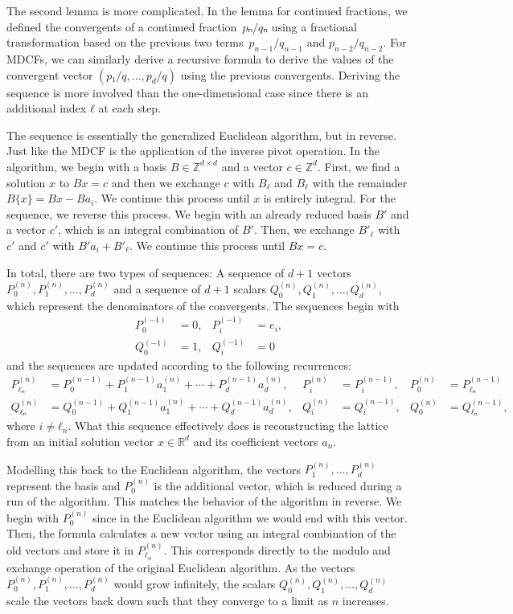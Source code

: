 The second lemma is more complicated.
In the lemma for continued fractions,
we defined the convergents of a continued fraction~$pₙ/qₙ$
using a fractional transformation based on the previous two
terms~$p_{n-1}/q_{n-1}$ and $p_{n-2}/q_{n-2}$.
For MDCFs, we can similarly derive a recursive formula to derive the values of
the convergent vector $(p₁/q, \dots, p_d/q)$ using the previous convergents.
Deriving the sequence is more involved than the one-dimensional case since
there is an additional index $ℓ$ at each step.

The sequence is essentially the generalized Euclidean algorithm, but in reverse.
Just like the MDCF is the application of the inverse pivot operation.
In the algorithm, we begin with a basis $B ∈ ℤ^{d×d}$ and a vector $c ∈ ℤ^d$.
First, we find a solution $x$ to $Bx = c$ and then we exchange $c$ with $B_ℓ$
and $B_ℓ$ with the remainder $B\{x\} = Bx - Ba_i$.
We continue this process until $x$ is entirely integral.
For the sequence, we reverse this process.
We begin with an already reduced basis $B'$ and a vector $c'$, which is an
integral combination of $B'$.
Then, we exchange $B'_{ℓ}$ with $c'$ and $c'$ with $B' a_i + B'_{ℓ}$.
We continue this process until $B x = c$.

In total, there are two types of sequences:
A sequence of $d+1$ vectors $P_0^{(n)}, P_1^{(n)}, …, P_d^{(n)}$ and a sequence
of $d+1$ scalars $Q_0^{(n)}, Q_1^{(n)}, …, Q_d^{(n)}$,
which represent the denominators of the convergents.
The sequences begin with
\begin{align*}
  P_0^{(-1)} & = 0, & P_i^{(-1)} & = e_i, \\
  Q_0^{(-1)} & = 1, & Q_i^{(-1)} & = 0
\end{align*}
and the sequences are updated according to the following recurrences:
\begin{align*}
  P_{ℓₙ}^{(n)} & = P_0^{(n-1)} + P_1^{(n-1)} a_1^{(n)} + ⋯ + P_d^{(n-1)} a_d^{(n)}, &
  P_i^{(n)} & = P_i^{(n-1)}, &
  P_0^{(n)} & = P_{ℓₙ}^{(n-1)} \\
  Q_{ℓₙ}^{(n)} & = Q_0^{(n-1)} + Q_1^{(n-1)} a_1^{(n)} + ⋯ + Q_d^{(n-1)} a_d^{(n)}, &
  Q_i^{(n)} & = Q_i^{(n-1)}, &
  Q_0^{(n)} & = Q_{ℓₙ}^{(n-1)},
\end{align*}
where $i ≠ ℓ_n$.
What this sequence effectively does is reconstructing the lattice from an
initial solution vector $x ∈ ℝ^d$ and its coefficient vectors $a_n$.

Modelling this back to the Euclidean algorithm,
the vectors $P_1^{(n)}, …, P_d^{(n)}$ represent the basis and $P_0^{(n)}$ is
the additional vector, which is reduced during a run of the algorithm.
This matches the behavior of the algorithm in reverse.
We begin with $P_0^{(n)}$ since in the Euclidean algorithm we would end with this vector.
Then, the formula calculates a new vector using an integral combination of the
old vectors and store it in $P_{ℓ_n}^{(n)}$.
This corresponds directly to the modulo and exchange operation of the original
Euclidean algorithm.
As the vectors $P_0^{(n)}, P_1^{(n)}, …, P_d^{(n)}$ would grow infinitely, the
scalars $Q_0^{(n)}, Q_1^{(n)}, …, Q_d^{(n)}$ scale the vectors back down such
that they converge to a limit as $n$ increases.

